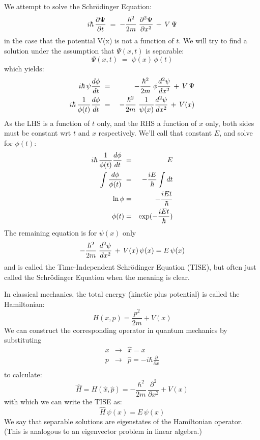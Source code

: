 \documentclass[12pt]{book}
\begin{document}
We attempt to solve the Schr\"odinger Equation:
\begin{equation}
i \hbar \,  \frac{\partial \Psi}{\partial t}  \; = \; - \frac{\hbar^2}{2 m} \;  \frac{\partial^2 \Psi}{\partial x^2}  \, + \, V \, \Psi
\end{equation}
in the case that the potential V(x) is not a function of $t$.  We will try to find a solution under the assumption that $\Psi(x,t)$ is separable:
\begin{equation}
\Psi(x,t) \; = \; \psi(x) \,\phi(t)
\end{equation}
which yields:
\begin{eqnarray*}
i \hbar \, \psi  \frac{d \phi}{dt}  \; &=& \; - \frac{\hbar^2}{2 m} \; \phi  \frac{d^2 \psi}{dx^2}  \, + \, V \, \Psi\\
i \hbar \, \frac{1}{\phi(t)}  \frac{d \phi}{dt}  \; &=& \; - \frac{\hbar^2}{2 m} \; \frac{1}{\psi(x)} \frac{d^2 \psi}{dx^2}  \, + \, V(x)\\
\end{eqnarray*}
As the LHS is a function of $t$ only, and the RHS a function of $x$ only, both sides must be constant wrt $t$ and $x$ respectively.  We'll call that constant $E$, and solve for $\phi(t)$:
\begin{eqnarray*}
i \hbar \, \frac{1}{\phi(t)}  \frac{d \phi}{dt}  \; &=& E\\
\int \frac{d\phi}{\phi(t)}  \; &=& -\frac{iE}{\hbar} \int dt\\
\ln \phi &=& -\frac{iEt}{\hbar}\\
\phi(t) &=& \exp(-\frac{iEt}{\hbar})\\
\end{eqnarray*}
The remaining equation is for $\psi(x)$ only
\begin{equation}
- \frac{\hbar^2}{2 m} \;  \frac{d^2 \psi}{dx^2}  \, + \, V(x) \, \psi(x) = E \, \psi(x)\\
\end{equation}
and is called the Time-Independent Schr\"odinger Equation (TISE), but often just called the Schr\"odinger Equation when the meaning is clear.

In classical mechanics, the total energy (kinetic plus potential) is called the Hamiltonian:
\begin{equation*}
H(x,p) = \frac{p^2}{2m} + V(x)
\end{equation*}
We can construct the corresponding operator in quantum mechanics by substituting 
\begin{eqnarray*}
x &\to& \hat{x} = x \\
p &\to& \hat{p} = -i\hbar \frac{\partial}{\partial x} \\
\end{eqnarray*}
to calculate:
\begin{equation}
\hat{H} = H(\hat{x}, \hat{p})= -\frac{\hbar^2}{2m}\,\frac{\partial^2}{\partial x^2} + V(x)
\end{equation}
with which we can write the TISE as:
\begin{equation}
\label{eqn:htise}
\hat{H} \, \psi(x) = E \, \psi(x)
\end{equation}
We say that separable solutions are eigenstates of the Hamiltonian operator.  (This is analogous to an eigenvector problem in linear algebra.)
\end{document}
